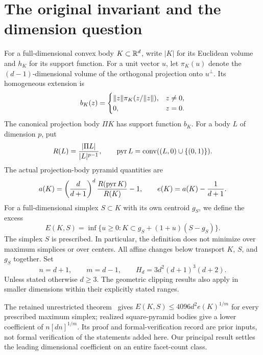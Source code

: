 \section{The original invariant and the dimension question}\label{sec:intro}
For a full-dimensional convex body $K\subset\mathbb R^d$, write $|K|$ for its
Euclidean volume and $h_K$ for its support function. For a unit vector $u$,
let $\pi_K(u)$ denote the $(d-1)$-dimensional volume of the orthogonal
projection onto $u^\perp$. Its homogeneous extension is
\[
 b_K(z)=\begin{cases}\lVert z\rVert\pi_K(z/\lVert z\rVert),&z\ne0,\\0,&z=0.\end{cases}
\]
The canonical projection body $\Pi K$ has support function $b_K$.
For a body $L$ of dimension $p$, put
\[
 R(L)=\frac{|\Pi L|}{|L|^{p-1}},\qquad
 \operatorname{pyr} L=\operatorname{conv}((L,0)\cup\{(0,1)\}).
\]
The actual projection-body pyramid quantities are
\begin{equation}\label{eq:actualdefect}
 a(K)=\left(\frac d{d+1}\right)^d\frac{R(\operatorname{pyr} K)}{R(K)}-1,
 \qquad e(K)=a(K)-\frac1{d+1}.
\end{equation}
For a full-dimensional simplex $S\subset K$ with its own centroid $g_S$,
we define the excess
\begin{equation}\label{eq:excess}
 E(K,S)=\inf\{u\ge0:K\subset g_S+(1+u)(S-g_S)\}.
\end{equation}
The simplex $S$ is prescribed. In particular, the definition does not
minimize over maximum simplices or over centers. All affine changes below
transport $K$, $S$, and $g_S$ together. Set
\[
 n=d+1,\qquad m=d-1,\qquad H_d=3d^2(d+1)^3(d+2).
\]
Unless stated otherwise $d\ge3$. The geometric clipping results also apply
in smaller dimensions within their explicitly stated ranges.

The retained unrestricted theorem~\cite{Quadratic} gives
$E(K,S)\le4096d^2e(K)^{1/m}$ for every prescribed maximum simplex;
realized square-pyramid bodies give a lower coefficient of
$n[dn]^{1/m}$. Its proof and formal-verification record are prior inputs,
not formal verification of the statements added here. Our principal result
settles the leading dimensional coefficient on an entire facet-count class.

